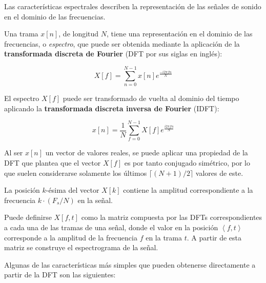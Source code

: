Las características espectrales describen la representación de las señales de sonido en el dominio de las frecuencias.

Una trama $x[n]$, de longitud $N$, tiene una representación en el dominio de las frecuencias, o \textit{espectro}, que puede ser obtenida mediante la aplicación de la \textbf{transformada discreta de Fourier} (DFT por sus siglas en inglés):

\begin{equation}
    \label{eq:DFT}
    X[f] = \sum_{n=0}^{N-1}{x[n]e^{\frac{-i2\pi fn}{N}}}
\end{equation}

El espectro $X[f]$ puede ser transformado de vuelta al dominio del tiempo aplicando la \textbf{transformada discreta inversa de Fourier} (IDFT):

\begin{equation}
    \label{eq:IDFT}
    x[n] = \frac{1}{N}\sum_{f=0}^{N-1}{X[f]e^{\frac{i2\pi fn}{N}}}
\end{equation}

Al ser $x[n]$ un vector de valores reales, se puede aplicar una propiedad de la DFT que plantea que el vector $X[f]$ es por tanto conjugado simétrico, por lo que suelen considerarse solamente los últimos $\lceil (N+1)/2 \rceil$ valores de este.

La posición $k$-ésima del vector $X[k]$ contiene la amplitud correspondiente a la frecuencia $k\cdot(F_s/N)$ en la señal.

Puede definirse $X[f,t]$ como la matriz compuesta por las DFTs correspondientes a cada una de las tramas de una señal, donde el valor en la posición $\left<f, t\right>$ corresponde a la amplitud de la frecuencia $f$ en la trama $t$.
A partir de esta matriz se construye el espectrograma de la señal.

Algunas de las características más simples que pueden obtenerse directamente a partir de la DFT son las siguientes:

